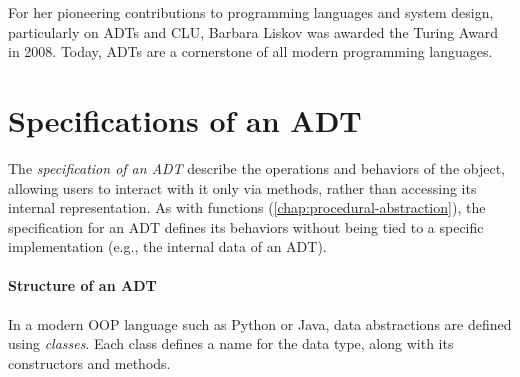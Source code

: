 \documentclass[oneside,11pt,dvipsnames]{book}
\begin{document}
For her pioneering contributions to programming languages and system design, particularly on ADTs and CLU, Barbara Liskov was awarded the Turing Award in 2008. Today, ADTs are a cornerstone of all modern programming languages.







\section{Specifications of an ADT}\label{sec:specs-adt}

The \emph{specification of an ADT} describe the operations and behaviors of the object, allowing users to interact with it only via methods, rather than accessing its internal representation. 
As with functions (\autoref{chap:procedural-abstraction}), the specification for an ADT defines its behaviors without being tied to a specific implementation (e.g., the internal data of an ADT).


\paragraph{Structure of an ADT} In a modern OOP language such as Python or Java, data abstractions are defined using \emph{classes}. Each class defines a name for the data type, along with its constructors and methods.
\end{document}
